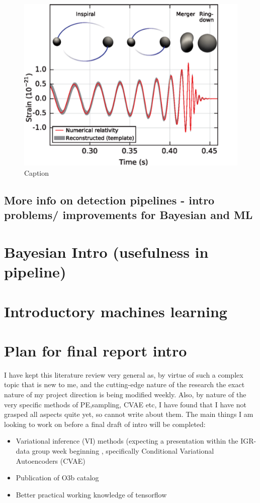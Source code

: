 \documentclass[11pt]{article}
\begin{document}
\begin{figure}[htb]
    \centering
    \includegraphics[width=.6\linewidth]{shared_resources/shared_figs/inspiral.png}
    \caption{Caption}
    \label{fig:events}
\end{figure}

\subsection*{More info on detection pipelines - intro problems/ improvements for Bayesian and ML}


\section*{Bayesian Intro (usefulness in pipeline)}


\section*{Introductory machines learning}

\section*{Plan for final report intro}

I have kept this literature review very general as, by virtue of such a complex topic that is new to me, and the cutting-edge nature of the research the exact nature of my project direction is being modified weekly. Also, by nature of the very specific methods of PE,sampling, CVAE etc, I have found that I have not grasped all aspects quite yet, so cannot write about them. The main things I am looking to work on before a final draft of intro will be completed:
\begin{itemize}
  \item Variational inference (VI) methods (expecting a presentation within the IGR-data group week beginning , specifically Conditional Variational Autoencoders (CVAE)
  \item Publication of O3b catalog
  \item Better practical working knowledge of tensorflow~\cite{tensorflow}
\end{itemize}
\end{document}
